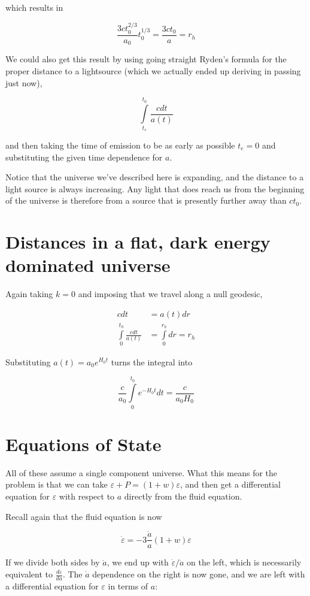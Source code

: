 \documentclass[12pt]{article}
\begin{document}
which results in 

\[ \frac{3ct_0^{2/3}}{a_0}t_0^{1/3} = \frac{3ct_0}{a}= r_h
\]

We could also get this result by using going straight Ryden's formula for the proper distance to a lightsource (which we actually ended up deriving in passing just now),

\[ \int\limits_{t_e}^{t_0}\frac{cdt}{a(t)}
\]

and then taking the time of emission to be as early as possible \(t_e = 0\) and substituting the given time dependence for \(a\).


Notice that the universe we've described here is expanding, and the distance to a light source is always increasing. Any light that does reach us from the beginning of the universe is therefore from a source that is presently further away than \(ct_0\).

\section{Distances in a flat, dark energy dominated universe}

Again taking \(k=0\) and imposing that we travel along a null geodesic,

\begin{align*}
cdt&=a(t)dr \\
\int\limits_0^{t_0}\frac{cdt}{a(t)} &= \int\limits_0^{r_h}dr = r_h
\end{align*}

Substituting \(a(t) = a_0e^{H_0t}\) turns the integral into

\[ \frac{c}{a_0}\int\limits_0^{t_0}e^{-H_0t}dt = \boxed{\frac{c}{a_0H_0}}
\]

\section{Equations of State}

All of these assume a single component universe. What this means for the problem is that we can take \(\varepsilon +P = (1+w)\varepsilon\), and then get a differential equation for \(\varepsilon\) with respect to \(a\) directly from the fluid equation.

Recall again that the fluid equation is now

\[\dot{\varepsilon} = -3\frac{\dot{a}}{a}(1+w)\varepsilon
\]

If we divide both sides by \(\dot{a}\), we end up with \(\dot{\varepsilon}/\dot{a}\) on the left, which is necessarily equivalent to \(\frac{d\varepsilon}{da}\). The \(\dot{a}\) dependence on the right is now gone, and we are left with a differential equation for \(\varepsilon\) in terms of \(a\):
\end{document}

